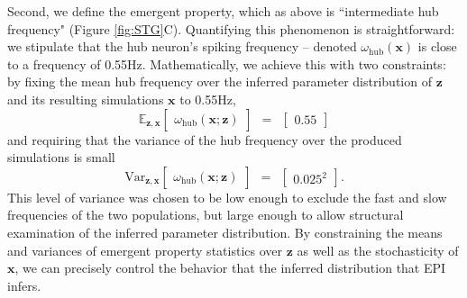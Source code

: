 \documentclass[11pt]{article}
\begin{document}
Second, we define the emergent property, which as above is ``intermediate hub  frequency" (Figure \ref{fig:STG}C).
Quantifying this phenomenon is straightforward: we stipulate that the hub neuron's spiking frequency -- denoted $\omega_{\text{hub}}(\mathbf{x})$ is close to a frequency of 0.55Hz.  
Mathematically, we achieve this with two constraints: by fixing the mean hub frequency over the inferred parameter distribution of $\mathbf{z}$ and its resulting simulations $\mathbf{x}$ to 0.55Hz,
\begin{equation}\label{eq:EP_STG1}
 \mathbb{E}_{\mathbf{z},\mathbf{x}}\begin{bmatrix} \omega_{\text{hub}}(\mathbf{x}; \mathbf{z}) \end{bmatrix}  ~~=~~  \begin{bmatrix} 0.55 \end{bmatrix}
\end{equation}
and requiring that the variance of the hub frequency over the produced simulations is small
\begin{equation}\label{eq:EP_STG2}
\text{Var}_{\mathbf{z},\mathbf{x}}\begin{bmatrix} \omega_{\text{hub}}(\mathbf{x}; \mathbf{z}) \end{bmatrix}  ~~=~~  \begin{bmatrix} 0.025^2 \end{bmatrix}.
\end{equation}
This level of variance was chosen to be low enough to exclude the fast and slow frequencies of the two populations, but large enough to allow structural examination of the inferred parameter distribution.
By constraining the means and variances of emergent property statistics over $\mathbf{z}$ as well as the stochasticity of $\mathbf{x}$, we can precisely control the behavior that the inferred distribution that EPI infers.
\end{document}
